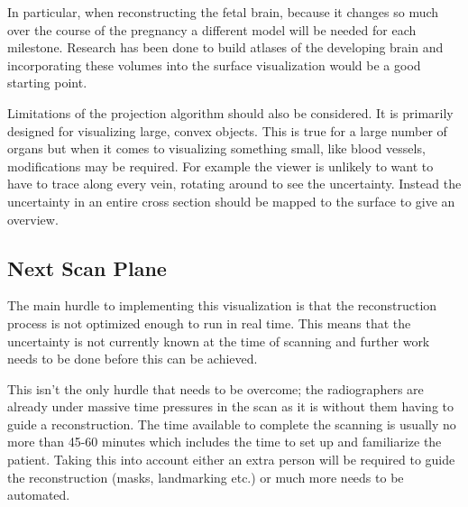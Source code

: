 In particular, when reconstructing the fetal brain, because it changes so much over the course of the pregnancy a different model will be needed for each milestone. Research has been done to build atlases of the developing brain\cite{fetalatlas} and incorporating these volumes into the surface visualization would be a good starting point.

Limitations of the projection algorithm should also be considered. It is primarily designed for visualizing large, convex objects. This is true for a large number of organs but when it comes to visualizing something small, like blood vessels, modifications may be required. For example the viewer is unlikely to want to have to trace along every vein, rotating around to see the uncertainty. Instead the uncertainty in an entire cross section should be mapped to the surface to give an overview.

\subsection*{Next Scan Plane}
The main hurdle to implementing this visualization is that the reconstruction process is not optimized enough to run in real time. This means that the uncertainty is not currently known at the time of scanning and further work needs to be done before this can be achieved.

This isn't the only hurdle that needs to be overcome; the radiographers are already under massive time pressures in the scan as it is without them having to guide a reconstruction. The time available to complete the scanning is usually no more than 45-60 minutes which includes the time to set up and familiarize the patient. Taking this into account either an extra person will be required to guide the reconstruction (masks, landmarking etc.) or much more needs to be automated.